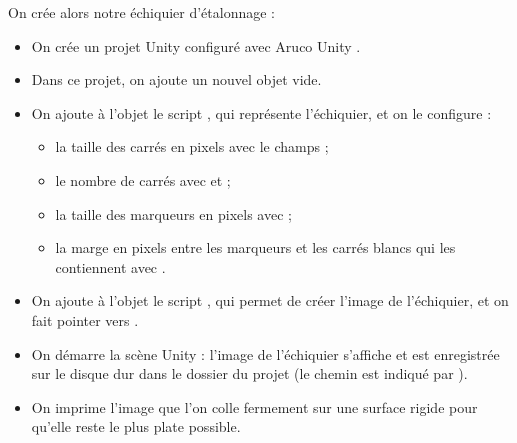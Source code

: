On crée alors notre échiquier d'étalonnage  :
\begin{itemize}
  \item On crée un projet Unity configuré avec Aruco Unity .
  \item Dans ce projet, on ajoute un nouvel objet vide.
  \item On ajoute à l'objet le script , qui représente l'échiquier, et on le configure :
  \begin{itemize}
    \item la taille des carrés en pixels avec le champs  ;
    \item le nombre de carrés avec  et  ;
    \item la taille des marqueurs en pixels avec  ;
    \item la marge en pixels entre les marqueurs et les carrés blancs qui les contiennent avec .
  \end{itemize}
  \item On ajoute à l'objet le script , qui permet de créer l'image de l'échiquier, et on fait pointer  vers .
  \item On démarre la scène Unity : l'image de l'échiquier s'affiche et est enregistrée sur le disque dur dans le dossier du projet (le chemin est indiqué par ).
  \item On imprime l'image que l'on colle fermement sur une surface rigide pour qu'elle reste le plus plate possible.
\end{itemize}


